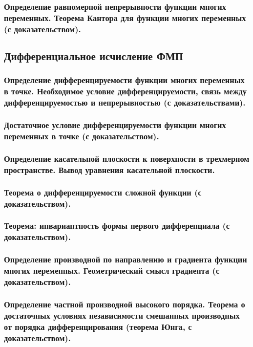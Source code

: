 \documentclass[10pt]{article}
\begin{document}
    \subsubsection{Определение равномерной непрерывности функции многих переменных. Теорема Кантора для функции многих переменных (с доказательством).}
    \subsection{Дифференциальное исчисление ФМП}
    \subsubsection{Определение дифференцируемости функции многих переменных в точке. Необходимое условие дифференцируемости, связь между дифференцируемостью и непрерывностью (с доказательствами).}
    \subsubsection{Достаточное условие дифференцируемости функции многих переменных в точке (с доказательством).}
    \subsubsection{Определение касательной плоскости к поверхности в трехмерном пространстве. Вывод уравнения касательной плоскости.}
    \subsubsection{Теорема о дифференцируемости сложной функции (с доказательством).}
    \subsubsection{Теорема: инвариантность формы первого дифференциала (с доказательством).}
    \subsubsection{Определение производной по направлению и градиента функции многих переменных. Геометрический смысл градиента (с доказательством).}
    \subsubsection{Определение частной производной высокого порядка. Теорема о достаточных условиях независимости смешанных производных от порядка дифференцирования (теорема Юнга, с доказательством).}
\end{document}
